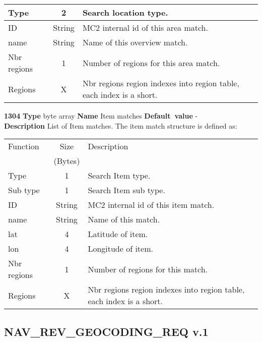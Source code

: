 \documentclass[a4paper]{article}
\begin{document}
\begin{list}{\textbf{ParamID}}{}
\begin{tabular}{|l|c|p{7cm}|}
    Type        & 2       & Search location type.                   \\\hline
    ID          & String  & MC2 internal id of this area match.     \\\hline
    name        & String  & Name of this overview match.            \\\hline
    Nbr regions & 1       & Number of regions for this area match.  \\\hline
    Regions     & X       & Nbr regions region indexes into region table, each 
                            index is a short.                          \\\hline
  \end{tabular}
\item \textbf{1304} \textbf{Type} byte array \textbf{Name} Item matches
                 \textbf{Default~value} - \\
  \label{Item matches}
  \textbf{Description} List of Item matches. The item match structure is
  defined as:\\
  \begin{tabular}{|l|c|p{7cm}|}
    \hline
    Function  & Size    & Description \\
              & (Bytes) &             \\\hline
    Type        & 1       & Search Item type.                          \\\hline
    Sub type    & 1       & Search Item sub type.                      \\\hline
    ID          & String  & MC2 internal id of this item match.        \\\hline
    name        & String  & Name of this match.                        \\\hline
    lat         & 4       & Latitude of item.                          \\\hline
    lon         & 4       & Longitude of item.                         \\\hline
    Nbr regions & 1       & Number of regions for this match.          \\\hline
    Regions     & X       & Nbr regions region indexes into region table, each 
                            index is a short.                          \\\hline
  \end{tabular}
\end{list}


\subsection{NAV\_REV\_GEOCODING\_REQ v.1}
\end{document}
